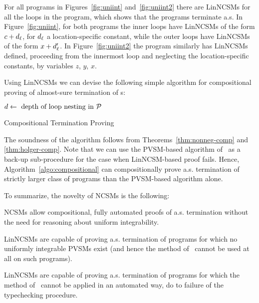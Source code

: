 \begin{example}
For all programs in Figures~\ref{fig:uniint} and~\ref{fig:uniint2} there are 
LinNCSMs for all the loops in the program, which shows that the programs 
terminate 
a.s. In Figure~\ref{fig:uniint}, for both programs the inner loops have 
LinNCSMs of the form $c+d_{\ell}$, for $d_{\ell}$ a location-specific constant, 
while the outer loops have LinNCSMs of the form $x+d_{\ell}'$. In 
Figure~\ref{fig:uniint2} the program similarly has LinNCSMs defined, proceeding 
from the innermost loop and neglecting the location-specific constants, by 
variables $z$, $y$, $x$.
\end{example}

Using LinNCSMs we can devise the following simple algorithm for compositional proving of almost-sure termination of \APP{}s:

\begin{algorithm}
\DontPrintSemicolon

$d\leftarrow \text{ depth of loop nesting in $\mathcal{P}$}$\;
\caption{Compositional Termination Proving}
\label{algo:compositional}
\end{algorithm}

The soundness of the algorithm follows from Theorems~\ref{thm:nonneg-comp} and 
\ref{thm:holger-comp}. Note that we can use the PVSM-based algorithm 
of~\cite{HolgerPOPL} as a back-up sub-procedure for the case when LinNCSM-based 
proof fails. Hence, Algorithm~\ref{algo:compositional} can compositionally 
prove a.s. termination of strictly larger class of programs than the PVSM-based 
algorithm alone.

To summarize, the novelty of NCSMs is the following:
\begin{compactenum}
\item
NCSMs allow compositional, fully automated proofs of a.s. termination without the need for reasoning about uniform integrability.
\item LinNCSMs are capable of proving a.s. termination of programs for which no uniformly integrable PVSMs exist (and hence the method of~\cite{HolgerPOPL} cannot be used at all on such programs).
\item LinNCSMs are capable of proving a.s. termination of programs for which the method of~\cite{HolgerPOPL} cannot be applied in an automated way, do to failure of the typechecking procedure.
\end{compactenum}

